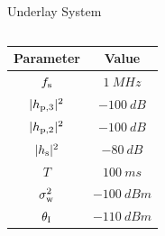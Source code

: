 \documentclass[16pt]{beamer}
\begin{document}
\begin{frame}[t]{Underlay System}
\begin{columns}
\begin{column}{0.45\columnwidth}
{			}
			\vspace{6.5mm}
			\onslide<2->
			{
				\centering
		                \renewcommand{\arraystretch}{1.7}
       		                \begin{tabular}{c||c}
                		\rowcolor{kit-green30}
                		Parameter & Value \\
                		\hline\hline
                		$f_{\text{s}}$ & $\SI{1}{MHz}$ \\ %
                		$|h_{\text{p,3}}|^2$ & $\SI{-100}{dB}$ \\ %
                		$|h_{\text{p,2}}|^2$ & $\SI{-100}{dB}$ \\ %
                		$|h_{\text{s}}|^2$ & $\SI{-80}{dB}$ \\ %
                		$T$ & $\SI{100}{ms}$ \\ %
				$\sigma^2_{\text{w}}$ & $\SI{-100}{dBm}$ \\ %
                		$\theta_{\text{I}}$ & $\SI{-110}{dBm}$ \\
                		\hline
        			\end{tabular}
	
}
\end{column}
\end{columns}
\end{frame}
\end{document}
